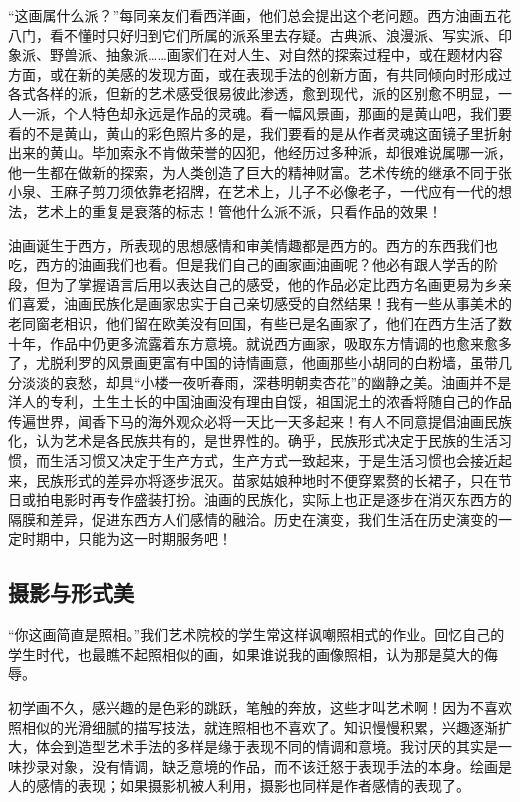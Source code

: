 \documentclass{article}
\begin{document}
“这画属什么派？”每同亲友们看西洋画，他们总会提出这个老问题。西方油画五花八门，看不懂时只好归到它们所属的派系里去存疑。古典派、浪漫派、写实派、印象派、野兽派、抽象派……画家们在对人生、对自然的探索过程中，或在题材内容方面，或在新的美感的发现方面，或在表现手法的创新方面，有共同倾向时形成过各式各样的派，但新的艺术感受很易彼此渗透，愈到现代，派的区别愈不明显，一人一派，个人特色却永远是作品的灵魂。看一幅风景画，那画的是黄山吧，我们要看的不是黄山，黄山的彩色照片多的是，我们要看的是从作者灵魂这面镜子里折射出来的黄山。毕加索永不肯做荣誉的囚犯，他经历过多种派，却很难说属哪一派，他一生都在做新的探索，为人类创造了巨大的精神财富。艺术传统的继承不同于张小泉、王麻子剪刀须依靠老招牌，在艺术上，儿子不必像老子，一代应有一代的想法，艺术上的重复是衰落的标志！管他什么派不派，只看作品的效果！

油画诞生于西方，所表现的思想感情和审美情趣都是西方的。西方的东西我们也吃，西方的油画我们也看。但是我们自己的画家画油画呢？他必有跟人学舌的阶段，但为了掌握语言后用以表达自己的感受，他的作品必定比西方名画更易为乡亲们喜爱，油画民族化是画家忠实于自己亲切感受的自然结果！我有一些从事美术的老同窗老相识，他们留在欧美没有回国，有些已是名画家了，他们在西方生活了数十年，作品中仍更多流露着东方意境。就说西方画家，吸取东方情调的也愈来愈多了，尤脱利罗的风景画更富有中国的诗情画意，他画那些小胡同的白粉墙，虽带几分淡淡的哀愁，却具“小楼一夜听春雨，深巷明朝卖杏花”的幽静之美。油画并不是洋人的专利，土生土长的中国油画没有理由自馁，祖国泥土的浓香将随自己的作品传遍世界，闻香下马的海外观众必将一天比一天多起来！有人不同意提倡油画民族化，认为艺术是各民族共有的，是世界性的。确乎，民族形式决定于民族的生活习惯，而生活习惯又决定于生产方式，生产方式一致起来，于是生活习惯也会接近起来，民族形式的差异亦将逐步泯灭。苗家姑娘种地时不便穿累赘的长裙子，只在节日或拍电影时再专作盛装打扮。油画的民族化，实际上也正是逐步在消灭东西方的隔膜和差异，促进东西方人们感情的融洽。历史在演变，我们生活在历史演变的一定时期中，只能为这一时期服务吧！
\subsection{摄影与形式美}
“你这画简直是照相。”我们艺术院校的学生常这样讽嘲照相式的作业。回忆自己的学生时代，也最瞧不起照相似的画，如果谁说我的画像照相，认为那是莫大的侮辱。

初学画不久，感兴趣的是色彩的跳跃，笔触的奔放，这些才叫艺术啊！因为不喜欢照相似的光滑细腻的描写技法，就连照相也不喜欢了。知识慢慢积累，兴趣逐渐扩大，体会到造型艺术手法的多样是缘于表现不同的情调和意境。我讨厌的其实是一味抄录对象，没有情调，缺乏意境的作品，而不该迁怒于表现手法的本身。绘画是人的感情的表现；如果摄影机被人利用，摄影也同样是作者感情的表现了。
\end{document}
